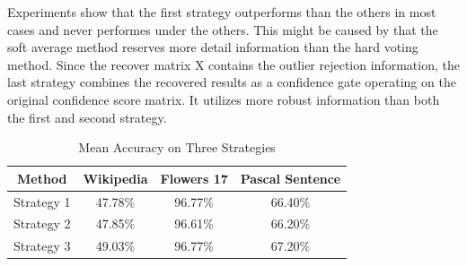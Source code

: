 \documentclass[letterpaper]{article}
\begin{document}
Experiments show that the first strategy outperforms than the others in most cases and never performes under the others. 
This might be caused by that the soft average method reserves more detail information than the hard voting method.
Since the recover matrix X contains the outlier rejection information,
the last strategy combines the recovered results as a confidence gate operating on the original confidence score matrix.
It utilizes more robust information than both the first and second strategy.

\begin{table}[h]\small
\centering
\begin{tabular}{c|c|c|c}
\hline
Method                       & Wikipedia &  Flowers 17  & Pascal Sentence \\\hline
Strategy 1                   & 47.78\%   &  96.77\%     &   66.40\%       \\\hline
Strategy 2                   & 47.85\%   &  96.61\%     &   66.20\%       \\\hline
Strategy 3                   & 49.03\%   &  96.77\%     &   67.20\%       \\
\hline
\end{tabular}
\caption{Mean Accuracy on Three Strategies}
\label{table:strategy}
\end{table}


\begin{quote}
\begin{small}
  
  
\end{small}
\end{quote}
\end{document}
